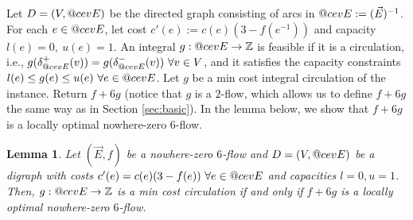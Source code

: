 \documentclass[11pt]{article}
\makeatletter
\newtheorem{lemma}[theorem]{Lemma}
\newcommand{\Z}{\mathbb{Z}}
\DeclareRobustCommand{\cev}[1]{{\mathpalette\do@cev{#1}}}
\newcommand{\do@cev}[2]{\vbox{\offinterlineskip
    \sbox\z@{$\m@th#1 x$}\ialign{##\cr
      \hidewidth\reflectbox{$\m@th#1\vec{}\mkern4mu$}\hidewidth\cr
      \noalign{\kern-\ht\z@}
      $\m@th#1#2$\cr
    }}}
\makeatother
\begin{document}
Let $D=(V,\cev{E})$ be the directed graph consisting of arcs in $\cev{E}:=(\vec{E})^{-1}$. For each $e\in \cev{E}$, let cost $c'(e):=c(e)(3-f(e^{-1}))$ and capacity $l(e)=0,\ u(e)=1$. An integral $g:\cev{E}\rightarrow \Z$ is feasible if it is a circulation, i.e., $g(\delta_{\cev{E}}^+(v))=g(\delta_{\cev{E}}^-(v))\ \forall v\in V$, and it satisfies the capacity constraints $l(e)\leq g(e)\leq u(e)\ \forall e\in \cev{E}$. Let $g$ be a min cost integral circulation of the instance. Return $f+6g$ (notice that $g$ is a $2$-flow, which allows us to define $f+6g$ the same way as in Section \ref{sec:basic}). In the lemma below, we show that $f+6g$ is a locally optimal nowhere-zero $6$-flow.

\begin{lemma}\label{lemma:localopt+mincostflow}
    Let $(\vec{E},f)$ be a nowhere-zero $6$-flow and $D=(V,\cev{E})$ be a digraph with costs $c'(e)=c(e)(3-f(e))\ \forall e\in\cev{E}$ and capacities $l=0,u=1$. Then, $g:\cev{E}\rightarrow \Z$ is a min cost circulation if and only if $f+6g$ is a locally optimal nowhere-zero $6$-flow.
\end{lemma}
\end{document}
